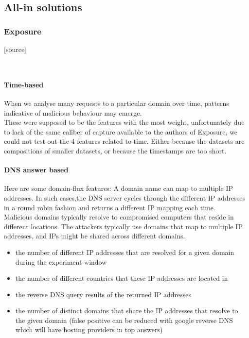 \subsection{All-in solutions}
\subsubsection{Exposure}
[source]

\\

\paragraph{Time-based}
When we analyse many requests to a particular domain over
time, patterns indicative of malicious behaviour may emerge.\\
These were supposed to be the features with the most weight, unfortunately due to lack of the same caliber of capture available to the authors of Exposure, we could not test out the 4 features related to time. Either because the datasets are compositions of smaller datasets, or because the timestamps are too short.
\paragraph{DNS answer based}
Here are some domain-flux features: A domain name can map to multiple IP addresses. In such cases,the DNS server cycles through the different IP addresses in a round robin fashion and returns a different IP mapping each time. \\
Malicious domains typically resolve to compromised computers that reside in different locations. The attackers typically use domains that map to multiple IP addresses, and IPs might be shared across different domains.
\begin{itemize}[noitemsep]
\item the number of different IP addresses that are resolved for a given domain during the experiment window
\item the number of different countries that these IP addresses are located in
\item the reverse DNS query results of the returned IP addresses
\item the number of distinct domains that share the IP addresses that resolve to the given domain (false positive can be reduced with google reverse DNS which will have hosting providers in top answers)
\end{itemize}
